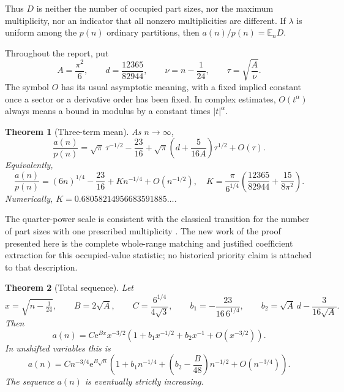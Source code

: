 \documentclass[11pt,letterpaper]{article}
\numberwithin{equation}{section}
\newtheorem{theorem}{Theorem}[section]
\theoremstyle{definition}\newtheorem{definition}[theorem]{Definition}
\theoremstyle{remark}\newtheorem{remark}[theorem]{Remark}
\newcommand{\E}{\mathbb E}
\newcommand{\ee}{\mathrm e}
\begin{document}
Thus $D$ is neither the number of occupied part sizes, nor the maximum multiplicity, nor an indicator that all nonzero multiplicities are different. If $\lambda$ is uniform among the $p(n)$ ordinary partitions, then $a(n)/p(n)=\E_nD$.

Throughout the report, put
\begin{equation}\label{dmv:cnt:eq:constants}
 A=\frac{\pi^2}{6},\qquad d=\frac{12365}{82944},\qquad
 \nu=n-\frac1{24},\qquad \tau=\sqrt{\frac A\nu}.
\end{equation}
The symbol $O$ has its usual asymptotic meaning, with a fixed implied constant once a sector or a derivative order has been fixed. In complex estimates, $O(t^\alpha)$ always means a bound in modulus by a constant times $|t|^\alpha$.

\begin{theorem}[Three-term mean]\label{dmv:cnt:thm:mean}
As $n\to\infty$,
\begin{equation}\label{dmv:cnt:eq:meantau}
\frac{a(n)}{p(n)}=\sqrt\pi\,\tau^{-1/2}-\frac{23}{16}
 +\sqrt\pi\left(d+\frac5{16A}\right)\tau^{1/2}+O(\tau).
\end{equation}
Equivalently,
\begin{equation}\label{dmv:cnt:eq:meann}
\frac{a(n)}{p(n)}=(6n)^{1/4}-\frac{23}{16}+K n^{-1/4}+O(n^{-1/2}),
\quad
K=\frac\pi{6^{1/4}}\left(\frac{12365}{82944}+\frac{15}{8\pi^2}\right).
\end{equation}
Numerically, $K=0.68058214956683591885\ldots$.
\end{theorem}

The quarter-power scale is consistent with the classical transition for the number of part sizes with one prescribed multiplicity \cite{ralaivaosaona}. The new work of the proof presented here is the complete whole-range matching and justified coefficient extraction for this occupied-value statistic; no historical priority claim is attached to that description.

\begin{theorem}[Total sequence]\label{dmv:cnt:thm:total}
Let
\begin{equation}\label{dmv:cnt:eq:totalconstants}
 x=\sqrt{n-\tfrac1{24}},\qquad B=2\sqrt A,\qquad
 C=\frac{6^{1/4}}{4\sqrt3},\qquad
 b_1=-\frac{23}{16\,6^{1/4}},\qquad
 b_2=\sqrt A\,d-\frac3{16\sqrt A}.
\end{equation}
Then
\begin{equation}\label{dmv:cnt:eq:totalx}
a(n)=C\ee^{Bx}x^{-3/2}
\left(1+b_1x^{-1/2}+b_2x^{-1}+O(x^{-3/2})\right).
\end{equation}
In unshifted variables this is
\begin{equation}\label{dmv:cnt:eq:totaln}
a(n)=C n^{-3/4}\ee^{B\sqrt n}
\left(1+b_1n^{-1/4}+\left(b_2-\frac B{48}\right)n^{-1/2}
 +O(n^{-3/4})\right).
\end{equation}
The sequence $a(n)$ is eventually strictly increasing.
\end{theorem}
\end{document}
